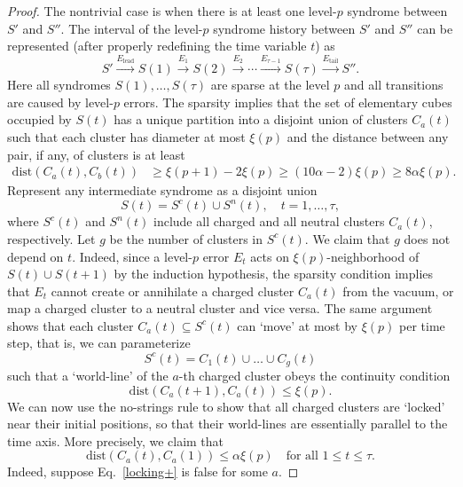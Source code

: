 \begin{proof}
The nontrivial case is when there is at least one level-$p$ syndrome between $S'$ and $S''$.
The interval of the level-$p$ syndrome history between $S'$ and $S''$ can be represented
(after properly redefining the time variable $t$) as
\[
S'\xrightarrow{E_\text{lead}}
S(1) \xrightarrow{E_1}
S(2) \xrightarrow{E_2}
\cdots
 \xrightarrow{E_{\tau-1}}
S(\tau) \xrightarrow{E_\text{tail}}
S''.
\]
Here all syndromes $S(1),\ldots,S(\tau)$ are sparse at the level $p$ and
all transitions are caused by level-$p$ errors.
The sparsity implies that
the set of elementary cubes occupied by  $S(t)$ has a unique
partition into a disjoint union of clusters $C_a(t)$ such that
each cluster has diameter at most $\xi(p)$ and the distance
between any pair, if any, of clusters is at least
\begin{align*}
\mathrm{dist}(C_a(t),C_b(t)) & \ge   \xi(p+1)-2\xi(p) \ge (10\alpha -2)\xi(p)  \ge   8\alpha \xi(p).
\end{align*}
Represent any intermediate syndrome as a disjoint union
\begin{equation}
\label{S1+}
S(t)=S^c(t) \cup S^n(t), \quad t=1,\ldots,\tau,
\end{equation}
where $S^c(t)$ and $S^n(t)$ include all charged and all neutral clusters $C_a(t)$, respectively.
Let $g$ be  the number of clusters in $S^c(t)$. We claim  that $g$  does not depend on $t$.
Indeed, since a level-$p$ error $E_t$ acts on $\xi(p)$-neighborhood of $S(t) \cup S(t+1)$
by the induction hypothesis,
the sparsity condition implies that $E_t$
cannot create or annihilate a charged cluster $C_a(t)$ from the vacuum, 
or map a charged cluster  to a neutral cluster and vice versa.
The same argument shows that each  cluster $C_a(t)\subseteq  S^c(t)$ can `move' 
at most by $\xi(p)$ per time step,
that is, we can parameterize
\[
S^c(t)=C_1(t) \cup \ldots \cup C_g(t)
\]
such that
a `world-line' of the $a$-th charged cluster
obeys the continuity condition
\begin{equation}
\label{cont+}
\mathrm{dist}(C_a(t+1),C_a(t)) \le \xi(p).
\end{equation}
We can now use the no-strings rule to show that
all charged clusters are `locked' near their
initial positions, so that their world-lines
are essentially parallel to the time axis.  More precisely, we claim that
\begin{equation}
\label{locking+}
\mathrm{dist}(C_a(t), C_a(1)) \le \alpha  \xi(p)  \quad \text{for all $1\le t \le \tau$}.
\end{equation}
Indeed, suppose Eq.~\eqref{locking+} is false for some $a$.

\end{proof}

